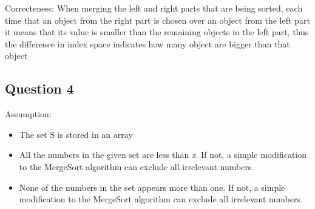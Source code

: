 \documentclass{article}
\begin{document}
Correcteness: When merging the left and right parts that are being sorted, each
time that an object from the right part is chosen over an object from the left
part it means that its value is smaller than the remaining objects in the left
part, thus the difference in index space indicates how many object are bigger
than that object
\clearpage

\subsection*{Question 4} Assumption:
\begin{itemize}
  \item The set S is stored in an array
  \item All the numbers in the given set are less than \textit{x}. If not, a
  simple modification to the MergeSort algorithm can exclude all irrelevant
  numbers.
  \item None of the numbers in the set appears more than one. If not, a simple
  modification to the MergeSort algorithm can exclude all irrelevant numbers.
\end{itemize}
\end{document}
